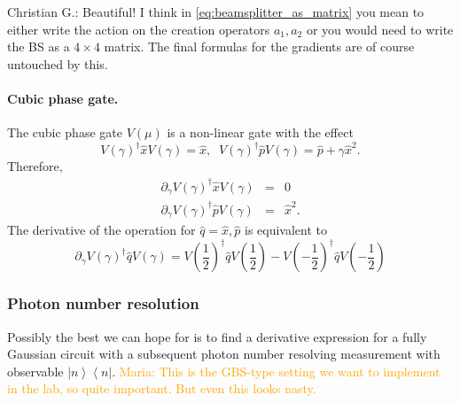 \documentclass[aps,pra,10pt,twocolumn,groupedaddress,nofootinbib]{revtex4-1}
\theoremstyle{plain}
\newcommand{\ket}[1]{\ensuremath{\left| #1 \right \rangle}}
\newcommand{\bra}[1]{\ensuremath{\left \langle #1 \right |}}
\newcommand{\ketbra}[2]{\ket{#1}\bra{#2}}
\newcommand{\x}{\hat{x}}
\newcommand{\p}{\hat{p}}
\newcommand{\maria}[1]{\textcolor{orange}{Maria: #1}}
\newcommand{\cg}[1]{\textcolor{cyan!80!black}{Christian G.: #1}}
\begin{document}
\cg{Beautiful! I think in \eqref{eq:beamsplitter_as_matrix} you mean to either write the action on the creation operators $a_1, a_2$ or you would need to write the BS as a $4\times4$ matrix. The final formulas for the gradients are of course untouched by this.}

\paragraph{Cubic phase gate.}
The cubic phase gate $V(\mu)$ is a non-linear gate with the effect
\[V(\gamma)^{\dagger} \x V(\gamma) = \x, \;\; V(\gamma)^{\dagger} \p V(\gamma) = \p + \gamma \x^2. \]
Therefore, 
\begin{eqnarray}
\partial_{\gamma} V(\gamma)^{\dagger} \x V(\gamma) &=& 0\\
\partial_{\gamma} V(\gamma)^{\dagger} \p V(\gamma) &=& \x^2.
\end{eqnarray} 
The derivative of the operation for $\hat{q} = \x, \p$ is equivalent to 
\[ \partial_{\gamma} V(\gamma)^{\dagger} \hat{q} V(\gamma) =   V\left(\frac{1}{2} \right)^{\dagger} \hat{q} V \left(\frac{1}{2} \right) - V \left(-\frac{1}{2} \right)^{\dagger} \hat{q} V\left(-\frac{1}{2} \right) \]



\subsubsection{Photon number resolution}

Possibly the best we can hope for is to find a derivative expression for a fully Gaussian circuit with a subsequent photon number resolving measurement with observable $\ketbra{n}{n}$. \maria{This is the GBS-type setting we want to implement in the lab, so quite important. But even this looks nasty.}\\
\end{document}
